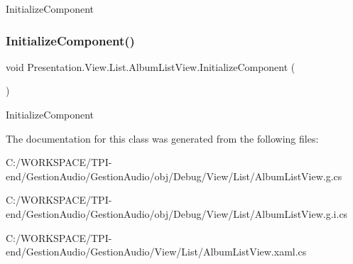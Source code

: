 Initialize\+Component 

\mbox{\label{class_presentation_1_1_view_1_1_list_1_1_album_list_view_a82f7cb6e5ba3705196d1dcf9d1067b34}} 
\subsubsection{\texorpdfstring{Initialize\+Component()}{InitializeComponent()}\hspace{0.1cm}{\footnotesize\ttfamily [4/4]}}
{\footnotesize\ttfamily void Presentation.\+View.\+List.\+Album\+List\+View.\+Initialize\+Component (\begin{DoxyParamCaption}{ }\end{DoxyParamCaption})}



Initialize\+Component 



The documentation for this class was generated from the following files\+:\begin{DoxyCompactItemize}
\item 
C\+:/\+W\+O\+R\+K\+S\+P\+A\+C\+E/\+T\+P\+I-\/end/\+Gestion\+Audio/\+Gestion\+Audio/obj/\+Debug/\+View/\+List/Album\+List\+View.\+g.\+cs\item 
C\+:/\+W\+O\+R\+K\+S\+P\+A\+C\+E/\+T\+P\+I-\/end/\+Gestion\+Audio/\+Gestion\+Audio/obj/\+Debug/\+View/\+List/Album\+List\+View.\+g.\+i.\+cs\item 
C\+:/\+W\+O\+R\+K\+S\+P\+A\+C\+E/\+T\+P\+I-\/end/\+Gestion\+Audio/\+Gestion\+Audio/\+View/\+List/Album\+List\+View.\+xaml.\+cs\end{DoxyCompactItemize}
